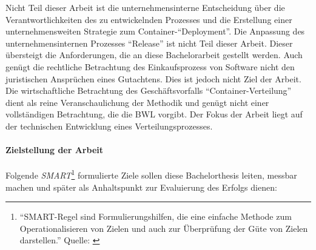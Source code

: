 \par
Nicht Teil dieser Arbeit ist die unternehmensinterne Entscheidung über die Verantwortlichkeiten des zu entwickelnden Prozesses und die Erstellung einer unternehmensweiten Strategie zum Container-\enquote{Deployment}. Die Anpassung des unternehmensinternen Prozesses \enquote{Release} ist nicht Teil dieser Arbeit. Dieser übersteigt die Anforderungen, die an diese Bachelorarbeit gestellt werden. Auch genügt die rechtliche Betrachtung des Einkaufsprozess von Software nicht den juristischen Ansprüchen eines Gutachtens. Dies ist jedoch nicht Ziel der Arbeit. Die wirtschaftliche Betrachtung des Geschäftsvorfalls  \enquote{Container-Verteilung} dient als reine Veranschaulichung der Methodik und genügt nicht einer vollständigen Betrachtung, die die \ac{BWL} vorgibt. Der Fokus der Arbeit liegt auf der technischen Entwicklung eines Verteilungsprozesses.

\paragraph{Zielstellung der Arbeit}
Folgende \textit{SMART}\footnote{\enquote{SMART-Regel sind Formulierungshilfen, die eine einfache Methode zum Operationalisieren von Zielen und auch zur Überprüfung der Güte von Zielen darstellen.} Quelle: \cite[][S.69]{dechange_projektmanagement_2020}} formulierte Ziele sollen diese Bachelorthesis leiten, messbar machen und später als Anhaltspunkt zur Evaluierung des Erfolgs dienen:


